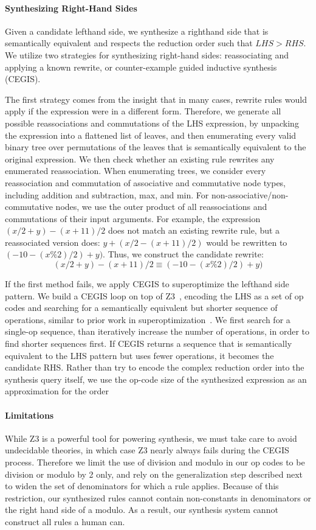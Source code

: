 \documentclass[sigplan,10pt,review,anonymous]{acmart}\settopmatter{printfolios=true,printccs=false,printacmref=false}
\begin{document}
\paragraph{Synthesizing Right-Hand Sides} Given a candidate lefthand side, we 
synthesize a righthand side that is semantically equivalent and respects the reduction
order such that $\mathit{LHS} > \mathit{RHS}$.  We utilize two strategies for synthesizing
right-hand sides: reassociating and applying a known rewrite, or counter-example guided
inductive synthesis (CEGIS).

The first strategy comes from the insight that in many cases, rewrite rules would apply
if the expression were in a different form.  Therefore, we generate all possible
reassociations and commutations of the LHS expression, by unpacking the expression
into a flattened list of leaves, and then enumerating every valid binary
tree over permutations of the leaves that is semantically equivalent to the original
expression.  We then check whether an existing rule rewrites any enumerated reassociation.
When enumerating trees, we consider every reassociation and commutation
of associative and commutative node types, including addition and subtraction, max, and
min.  For non-associative/non-commutative nodes, we use the outer product of all reassociations
and commutations of their input arguments.  For example, the expression $(x/2 + y) - (x + 11)/2$
does not match an existing rewrite rule, but a reassociated version does: $y + (x/2 - (x + 11)/2)$
would be rewritten to $(-10 - (x \% 2)/2) + y)$.  Thus, we construct the candidate rewrite:
$$(x/2 + y) - (x + 11)/2 \equiv (-10 - (x \% 2)/2) + y)$$

If the first method fails, we apply CEGIS to superoptimize the lefthand side pattern.
We build a CEGIS loop on top of Z3~\cite{de2008z3}, encoding the LHS as a set of op codes
and searching for a semantically equivalent but shorter sequence of operations, similar
to prior work in superoptimization~\cite{regehr2018superoptimization, mangpo2016superoptimization}.
We first search for a single-op sequence,
than iteratively increase the number of operations, in order to find shorter sequences
first.  If CEGIS returns a sequence that is semantically equivalent to the LHS pattern but uses fewer
operations, it becomes the candidate RHS. Rather than try to encode the complex reduction order into the synthesis query itself, we use the op-code size of the synthesized expression as an approximation for the order

\paragraph{Limitations} While Z3 is a powerful tool for powering synthesis, we must take care to avoid
undecidable theories, in which case Z3 nearly always fails during the CEGIS process.
Therefore we limit the use of division and modulo in our op codes to be division
or modulo by 2 only, and rely on the generalization step described next to
widen the set of denominators for which a rule applies.  Because of this
restriction, our synthesized rules cannot contain non-constants in denominators
or the right hand side of a modulo.  As a result, our synthesis system cannot
construct all rules a human can.
\end{document}
